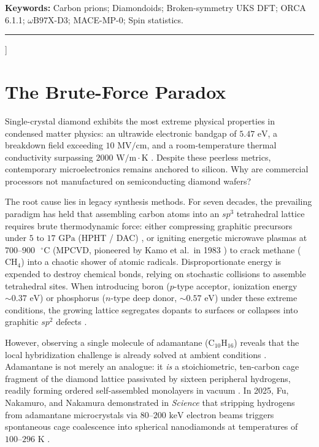 \documentclass[10pt,twocolumn,a4paper]{article}
\begin{document}
\begin{@twocolumnfalse}
    \vspace{0.45em}
    \noindent\textbf{Keywords:} Carbon prions; Diamondoids; Broken-symmetry UKS DFT; ORCA 6.1.1; $\omega\text{B97X-D3}$; MACE-MP-0; Spin statistics.
    \vspace{0.55em}
    \hrule
    \vspace{1.0em}
  \end{@twocolumnfalse}
]

\section{The Brute-Force Paradox}
Single-crystal diamond exhibits the most extreme physical properties in condensed matter physics: an ultrawide electronic bandgap of $5.47\text{ eV}$, a breakdown field exceeding $10\text{ MV/cm}$, and a room-temperature thermal conductivity surpassing $2000\text{ W/m}\cdot\text{K}$ \cite{Koizumi2001}. Despite these peerless metrics, contemporary microelectronics remains anchored to silicon. Why are commercial processors not manufactured on semiconducting diamond wafers?

The root cause lies in legacy synthesis methods. For seven decades, the prevailing paradigm has held that assembling carbon atoms into an $sp^3$ tetrahedral lattice requires brute thermodynamic force: either compressing graphitic precursors under $5\text{ to }17\text{ GPa}$ (HPHT / DAC) \cite{Suzuki2024}, or igniting energetic microwave plasmas at $700\text{--}900\text{ }^\circ\text{C}$ (MPCVD, pioneered by Kamo et al.\ in 1983 \cite{Kamo1983}) to crack methane ($\text{CH}_4$) into a chaotic shower of atomic radicals. Disproportionate energy is expended to destroy chemical bonds, relying on stochastic collisions to assemble tetrahedral sites. When introducing boron ($p$-type acceptor, ionization energy $\sim 0.37\text{ eV}$) or phosphorus ($n$-type deep donor, $\sim 0.57\text{ eV}$) under these extreme conditions, the growing lattice segregates dopants to surfaces or collapses into graphitic $sp^2$ defects \cite{Koizumi2001}.

However, observing a single molecule of adamantane ($\text{C}_{10}\text{H}_{16}$) reveals that the local hybridization challenge is already solved at ambient conditions \cite{Schleyer1957,Dahl2003}. Adamantane is not merely an analogue: it \textit{is} a stoichiometric, ten-carbon cage fragment of the diamond lattice passivated by sixteen peripheral hydrogens, readily forming ordered self-assembled monolayers in vacuum \cite{Yang2007}. In 2025, Fu, Nakamuro, and Nakamura demonstrated in \textit{Science} that stripping hydrogens from adamantane microcrystals via $80\text{--}200\text{ keV}$ electron beams triggers spontaneous cage coalescence into spherical nanodiamonds at temperatures of $100\text{--}296\text{ K}$ \cite{Fu2025}.
\end{document}
